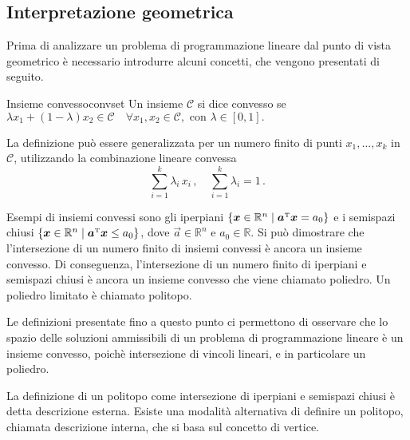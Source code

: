 \subsection{Interpretazione geometrica}
Prima di analizzare un problema di programmazione lineare dal punto di vista geometrico è necessario introdurre alcuni
concetti, che vengono presentati di seguito.

\begin{definition}{Insieme convesso}{convset}
    Un insieme \( \mathcal{C} \) si dice convesso se
    \(
        \lambda x_1 + (1 - \lambda) x_2 \in \mathcal{C} \quad \forall x_1, x_2 \in \mathcal{C}, \text{ con } \lambda
        \in [0, 1].
    \)
\end{definition}
\noindent
La definizione può essere generalizzata per un numero finito di punti \( x_1,\ldots, x_k \) in \( \mathcal{C} \),
utilizzando la combinazione lineare convessa
\begin{equation}
    \sum_{i = 1}^k \lambda_i\, x_i\,, \quad \sum_{i = 1}^k \lambda_i = 1\,.
\end{equation}

Esempi di insiemi convessi sono gli iperpiani \( \{\bm{x} \in \mathbb{R}^n \mid \bm{a}^{\scriptscriptstyle\mathrm{T}} \bm{x} = a_0\} \) e i
semispazi chiusi \( \{\bm{x} \in \mathbb{R}^n \mid \bm{a}^{\scriptscriptstyle\mathrm{T}} \bm{x} \leq a_0\} \), dove \( \vec{a} \in \mathbb{R}^n
\) e \( a_0 \in \mathbb{R} \). Si può dimostrare che l'intersezione di un numero finito di insiemi convessi è ancora un
insieme convesso. Di conseguenza, l'intersezione di un numero finito di iperpiani e semispazi chiusi è ancora un insieme
convesso che viene chiamato poliedro. Un poliedro limitato è chiamato politopo.

Le definizioni presentate fino a questo punto ci permettono di osservare che lo spazio delle soluzioni ammissibili di un
problema di programmazione lineare è un insieme convesso, poichè intersezione di vincoli lineari, e in particolare un
poliedro.

La definizione di un politopo come intersezione di iperpiani e semispazi chiusi è detta descrizione esterna. Esiste una
modalità alternativa di definire un politopo, chiamata descrizione interna, che si basa sul concetto di vertice.

